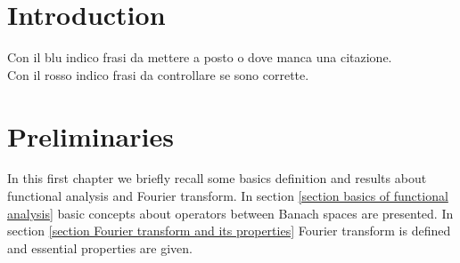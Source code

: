 \documentclass[corpo=11pt, stile=classica, tipotesi=custom,
greek, evenboxes, english]{toptesi}
\numberwithin{equation}{chapter}
\theoremstyle{remark}
\begin{document}
\english
	


\tableofcontents

\ringraziamenti

\sommario

\chapter{Introduction}
{\color{blue} Con il blu indico frasi da mettere a posto o dove manca una citazione.}\\
{\color{red} Con il rosso indico frasi da controllare se sono corrette.}




\chapter{Preliminaries}\label{chapter preliminaries}
In this first chapter we briefly recall some basics definition and results about functional analysis and Fourier transform. In section \ref{section basics of functional analysis} basic concepts about operators between Banach spaces are presented. In section \ref{section Fourier transform and its properties} Fourier transform is defined and essential properties are given.
\end{document}
